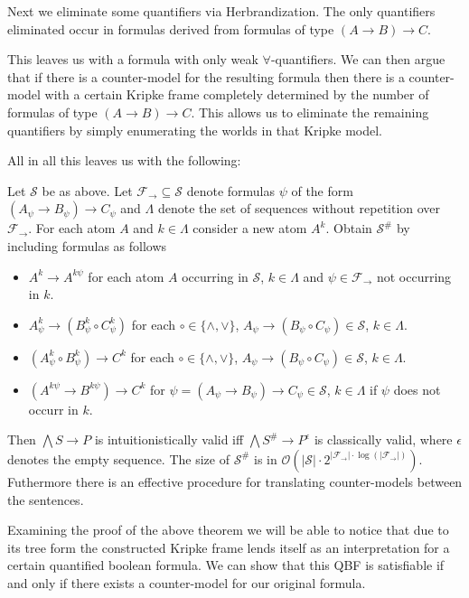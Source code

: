 \documentclass[a4paper,UKenglish,cleveref, autoref, thm-restate]{lipics-v2021}
\begin{document}
Next we eliminate some quantifiers via Herbrandization. The only quantifiers eliminated occur in formulas derived from formulas of type $(A\to B)\to C$.

This leaves us with a formula with only weak $\forall$-quantifiers. We can then argue that if there is a counter-model for the resulting formula then there is a counter-model with a certain Kripke frame completely determined by the number of formulas of type $(A\to B)\to C$. This allows us to eliminate the remaining quantifiers by simply enumerating the worlds in that Kripke model.

All in all this leaves us with the following:

\begin{theorem}
	Let $\mathcal S$ be as above. Let $\mathcal F_\to\subseteq\mathcal S$ denote formulas $\psi$ of the form $(A_\psi\to B_\psi)\to C_\psi$ and $\Lambda$ denote the set of sequences without repetition over $\mathcal F_\to$. For each atom $A$ and $k\in\Lambda$ consider a new atom $A^k$. Obtain $\mathcal S^\#$ by including formulas as follows
	\begin{itemize}
		\item $A^k\to A^{k\psi}$ for each atom $A$ occurring in $\mathcal S$, $k\in\Lambda$ and $\psi\in\mathcal F_\to$ not occurring in $k$.
		\item $A_\psi^k\to (B_\psi^k\circ C_\psi^k)$ for each $\circ\in\{\wedge,\vee\}$, $A_\psi\to (B_\psi\circ C_\psi)\in\mathcal S$, $k\in\Lambda$.
		\item $(A_\psi^k\circ B_\psi^k)\to C^k$ for each $\circ\in\{\wedge,\vee\}$, $A_\psi\to (B_\psi\circ C_\psi)\in\mathcal S$, $k\in\Lambda$.
		\item $(A^{k\psi}\to B^{k\psi})\to C^k$ for $\psi = (A_\psi\to B_\psi)\to C_\psi\in\mathcal S$, $k\in\Lambda$ if $\psi$ does not occurr in $k$.
	\end{itemize}
	Then $\bigwedge S\to P$ is intuitionistically valid iff $\bigwedge S^\#\to P^\epsilon$ is classically valid, where $\epsilon$ denotes the empty sequence. The size of $\mathcal S^\#$ is in $\mathcal O(|\mathcal S|\cdot2^{|\mathcal F_\to|\cdot\log(|\mathcal F_\to|)})$. Futhermore there is an effective procedure for translating counter-models between the sentences.
\end{theorem}

Examining the proof of the above theorem we will be able to notice that due to its tree form the constructed Kripke frame lends itself as an interpretation for a certain quantified boolean formula. We can show that this QBF is satisfiable if and only if there exists a counter-model for our original formula.
\end{document}
